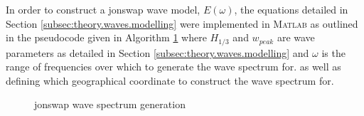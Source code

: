 In order to construct a \acs{jonswap} wave model, $E(\omega)$, the equations detailed in Section \ref{subsec:theory.waves.modelling} were implemented in \textsc{Matlab} as outlined in the pseudocode given in Algorithm \ref{alg:jonswap} where $H_{1/3}$ and $w_{peak}$ are wave parameters as detailed in Section \ref{subsec:theory.waves.modelling} and $\omega$ is the range of frequencies over which to generate the wave spectrum for. as well as defining which geographical coordinate to construct the wave spectrum for. 


\begin{figure}[H]
  \vspace{0.5cm}
  \centering
  \captionsetup{type=figure}
  \begin{minipage}{.75\linewidth}
    \begin{algorithm}[H]
      \caption{\acs{jonswap} wave spectrum generation\label{alg:jonswap}}

      \DontPrintSemicolon
      \SetAlgoLined


      \BlankLine
      \vspace{0.5cm}
    \end{algorithm}
  \end{minipage}
\end{figure}


